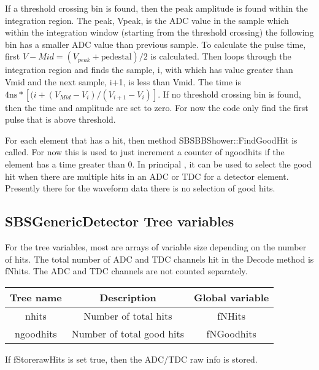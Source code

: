 \documentclass[11pt]{article}
\begin{document}
If a threshold crossing bin is found, then the peak amplitude is found within the integration region. The peak, Vpeak,  is the ADC value in the sample which within the integration window (starting from the threshold crossing) the following bin has a smaller ADC value than previous sample.
To calculate the pulse time, first  $V-{Mid} = (V_{peak} + \mbox{pedestal})/2$ is calculated. Then loops through the
integration region and finds the sample, i, with which has value greater than Vmid and the next sample, i+1, is
less than Vmid. The time is $4\mbox{ns}*\left[(i+(V_{Mid}-V_i)/(V_{i+1}-V_i)\right]$.
If no threshold crossing bin is found, then the time and amplitude are set to zero.
For now the code only find the first pulse that is above threshold.

For each element that has a hit, then method SBSBBShower::FindGoodHit is called. For now this
is used to just increment a counter of ngoodhits if the element has a time greater than 0.
In principal , it can be used to select the good hit when there are multiple hits in an ADC or TDC for a detector element. Presently there for the waveform  data there is no selection of good hits.



 

\subsection{SBSGenericDetector Tree variables}

For the tree variables, most are arrays of variable size depending on the number of hits. 
The total number of  ADC and TDC channels hit in the Decode method is fNhits. The ADC and TDC channels
are not counted separately.
\begin{center}
	\begin{tabular}{|c|c|c|}
		\hline 
		Tree name	& Description &  Global variable\\ 
		\hline 
		nhits	& Number of total hits & fNHits  \\ 
		\hline 
		ngoodhits	& Number of total good hits & fNGoodhits \\ 
		\hline 
\end{tabular} 
\end{center}

If fStorerawHits is set true, then the ADC/TDC raw info is stored.
\end{document}
